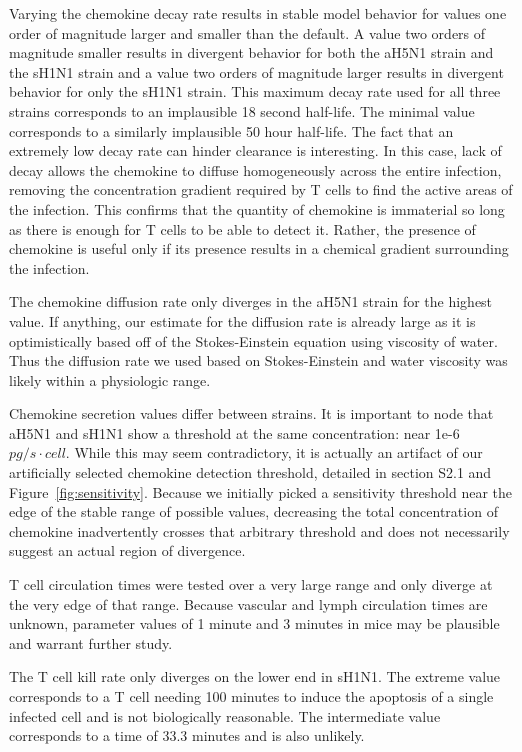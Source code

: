 \documentclass[10pt]{article}
\begin{document}
Varying the chemokine decay rate results in stable model behavior for values one order of magnitude larger and smaller than the default.  A value two orders of magnitude smaller results in divergent behavior for both the aH5N1 strain and the sH1N1 strain and a value two orders of magnitude larger results in divergent behavior for only the sH1N1 strain.  This maximum decay rate used for all three strains corresponds to an implausible 18 second half-life.  The minimal value corresponds to a similarly implausible 50 hour half-life.  The fact that an extremely low decay rate can hinder clearance is interesting.  In this case, lack of decay allows the chemokine to diffuse homogeneously across the entire infection, removing the concentration gradient required by T cells to find the active areas of the infection.  This confirms that the quantity of chemokine is immaterial so long as there is enough for T cells to be able to detect it.  Rather, the presence of chemokine is useful only if its presence results in a chemical gradient surrounding the infection.

The chemokine diffusion rate only diverges in the aH5N1 strain for the highest value.  If anything, our estimate for the diffusion rate is already large as it is optimistically based off of the Stokes-Einstein equation using viscosity of water.  Thus the diffusion rate we used based on Stokes-Einstein and water viscosity was likely within a physiologic range.

Chemokine secretion values differ between strains.  It is important to node that aH5N1 and sH1N1 show a threshold at the same concentration: near 1e-6 $pg/s\cdot cell$.  While this may seem contradictory, it is actually an artifact of our artificially selected chemokine detection threshold, detailed in section S2.1 and Figure~\ref{fig:sensitivity}.  Because we initially picked a sensitivity threshold near the edge of the stable range of possible values, decreasing the total concentration of chemokine inadvertently crosses that arbitrary threshold and does not necessarily suggest an actual region of divergence.

T cell circulation times were tested over a very large range and only diverge at the very edge of that range.  Because vascular and lymph circulation times are unknown, parameter values of 1 minute and 3 minutes in mice may be plausible and warrant further study.

The T cell kill rate only diverges on the lower end in sH1N1.  The extreme value corresponds to a T cell needing 100 minutes to induce the apoptosis of a single infected cell and is not biologically reasonable.  The intermediate value corresponds to a time of 33.3 minutes and is also unlikely.
\end{document}
